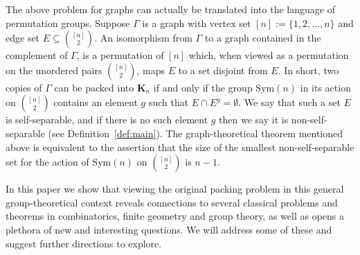 \documentclass[a4paper]{amsart}
\newcommand{\Sym}{\mathrm{Sym}}
\newcommand{\K}{\mathbf{K}}
\theoremstyle{definition}
\begin{document}
The above problem for graphs can actually be translated into the language of permutation groups. Suppose $\Gamma$ is a graph with vertex set $[n]:=\{1,2,\ldots,n\}$ and edge set $E \subseteq {[n] \choose 2}$. An isomorphism from $\Gamma$ to a graph  contained in the complement of $\Gamma$, is a permutation of $[n]$ which, when viewed as a permutation on the unordered pairs ${[n] \choose 2}$, maps $E$ to a set disjoint from $E$. In short, two copies of $\Gamma$ can be packed into $\K_n$ if and only if the group $\Sym(n)$ in its action on ${[n] \choose 2}$ contains an element $g$ such that $E\cap E^g = \emptyset$. We say that such a set $E$ is self-separable, and if there is no such element $g$ then we say it is non-self-separable (see Definition~\ref{def:main}). The graph-theoretical theorem mentioned above is equivalent to the assertion that the size of the smallest non-self-separable set for the action of $\Sym(n) $ on ${[n] \choose 2}$ is $n-1$.

In this paper we show that viewing the original packing problem in this general group-theoretical context reveals connections to several classical problems and theorems in combinatorics, finite geometry and group theory, as well as
opens a plethora of new and interesting questions. We will address some of these and suggest further directions to explore.%

\end{document}
